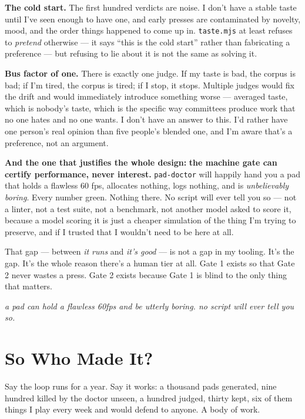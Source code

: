 \documentclass[10pt,letterpaper,twocolumn]{article}
\newcommand{\pull}[1]{%
  \par\vspace{0.4em}
  {\aclight\small\color{acpink}\itshape #1}\par
  \vspace{0.4em}}
\begin{document}
\textbf{The cold start.} The first hundred verdicts are noise. I don't have a stable taste until I've seen enough to have one, and early presses are contaminated by novelty, mood, and the order things happened to come up in. \texttt{taste.mjs} at least refuses to \emph{pretend} otherwise --- it says ``this is the cold start'' rather than fabricating a preference --- but refusing to lie about it is not the same as solving it.

\textbf{Bus factor of one.} There is exactly one judge. If my taste is bad, the corpus is bad; if I'm tired, the corpus is tired; if I stop, it stops. Multiple judges would fix the drift and would immediately introduce something worse --- averaged taste, which is nobody's taste, which is the specific way committees produce work that no one hates and no one wants. I don't have an answer to this. I'd rather have one person's real opinion than five people's blended one, and I'm aware that's a preference, not an argument.

\textbf{And the one that justifies the whole design:} \textbf{the machine gate can certify performance, never interest.} \texttt{pad-doctor} will happily hand you a pad that holds a flawless 60 fps, allocates nothing, logs nothing, and is \emph{unbelievably boring}. Every number green. Nothing there. No script will ever tell you so --- not a linter, not a test suite, not a benchmark, not another model asked to score it, because a model scoring it is just a cheaper simulation of the thing I'm trying to preserve, and if I trusted that I wouldn't need to be here at all.

That gap --- between \emph{it runs} and \emph{it's good} --- is not a gap in my tooling. It's the gap. It's the whole reason there's a human tier at all. Gate 1 exists so that Gate 2 never wastes a press. Gate 2 exists because Gate 1 is blind to the only thing that matters.

\pull{a pad can hold a flawless 60fps and be utterly boring. no script will ever tell you so.}


\section{So Who Made It?}

Say the loop runs for a year. Say it works: a thousand pads generated, nine hundred killed by the doctor unseen, a hundred judged, thirty kept, six of them things I play every week and would defend to anyone. A body of work.
\end{document}
